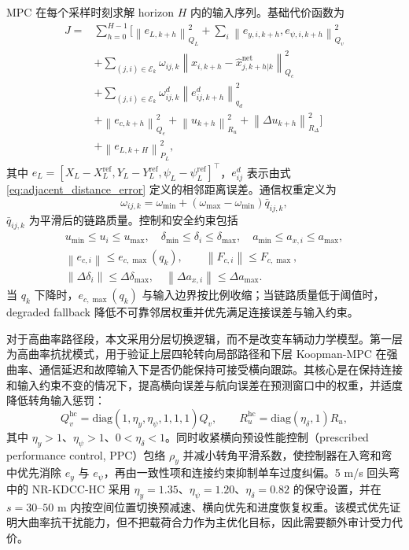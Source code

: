 \documentclass[twocolumn,3p,times,procedia]{elsarticle}
\newcommand{\MethodHC}{NR-KDCC-HC}
\newcommand{\norm}[1]{\left\lVert #1 \right\rVert}
\begin{document}
MPC 在每个采样时刻求解 horizon $H$ 内的输入序列。基础代价函数为
\begin{equation}
\begin{aligned}
J=&\sum_{h=0}^{H-1}
\Big[
\norm{e_{L,k+h}}_{Q_L}^2+
\sum_i\norm{e_{y,i,k+h},e_{\psi,i,k+h}}_{Q_v}^2\\
&+\sum_{(j,i)\in\mathcal E_k}\omega_{ij,k}\norm{x_{i,k+h}-\hat x_{j,k+h|k}^{\mathrm{net}}}_{Q_c}^2\\
&+\sum_{(j,i)\in\mathcal E_k}\omega^d_{ij,k}\norm{e^d_{ij,k+h}}_{q_d}^2\\
&+\norm{e_{c,k+h}}_{Q_e}^2+
\norm{u_{k+h}}_{R_u}^2+
\norm{\Delta u_{k+h}}_{R_\Delta}^2
\Big]\\
&+\norm{e_{L,k+H}}_{P_L}^2 ,
\end{aligned}
\label{eq:mpc_cost}
\end{equation}
其中 $e_L=[X_L-X_L^{\mathrm{ref}},Y_L-Y_L^{\mathrm{ref}},\psi_L-\psi_L^{\mathrm{ref}}]^\top$，$e^d_{ij}$ 表示由式 \eqref{eq:adjacent_distance_error} 定义的相邻距离误差。通信权重定义为
\begin{equation}
\omega_{ij,k}=\omega_{\min}+(\omega_{\max}-\omega_{\min})\bar q_{ij,k},
\label{eq:comm_weight}
\end{equation}
$\bar q_{ij,k}$ 为平滑后的链路质量。控制和安全约束包括
\begin{equation}
\begin{gathered}
u_{\min}\le u_i\le u_{\max},\quad
\delta_{\min}\le\delta_i\le\delta_{\max},\quad
a_{\min}\le a_{x,i}\le a_{\max},\\
\norm{e_{c,i}}\le e_{c,\max}(q_k),\qquad
\norm{F_{c,i}}\le F_{c,\max},\\
\norm{\Delta \delta_i}\le \Delta\delta_{\max},\quad
\norm{\Delta a_{x,i}}\le \Delta a_{\max}.
\end{gathered}
\label{eq:constraints}
\end{equation}
当 $q_k$ 下降时，$e_{c,\max}(q_k)$ 与输入边界按比例收缩；当链路质量低于阈值时，degraded fallback 降低不可靠邻居权重并优先满足连接误差与输入约束。

对于高曲率路径段，本文采用分层切换逻辑，而不是改变车辆动力学模型。第一层为高曲率抗扰模式，用于验证上层四轮转向局部路径和下层 Koopman-MPC 在强曲率、通信延迟和故障输入下是否仍能保持可接受横向跟踪。其核心是在保持连接和输入约束不变的情况下，提高横向误差与航向误差在预测窗口中的权重，并适度降低转角输入惩罚：
\begin{equation}
Q_v^{\mathrm{hc}}=\mathrm{diag}(1,\eta_y,\eta_\psi,1,1,1)Q_v,\qquad
R_u^{\mathrm{hc}}=\mathrm{diag}(\eta_\delta,1)R_u ,
\label{eq:high_curvature_lateral_priority}
\end{equation}
其中 $\eta_y>1$、$\eta_\psi>1$、$0<\eta_\delta<1$。同时收紧横向预设性能控制（prescribed performance control, PPC）包络 $\rho_y$ 并减小转角平滑系数，使控制器在入弯和弯中优先消除 $e_y$ 与 $e_\psi$，再由一致性项和连接约束抑制单车过度纠偏。5 m/s 回头弯中的 \MethodHC{} 采用 $\eta_y=1.35$、$\eta_\psi=1.20$、$\eta_\delta=0.82$ 的保守设置，并在 $s=30$--$50$ m 内按空间位置切换预减速、横向优先和进度恢复权重。该模式优先证明大曲率抗干扰能力，但不把载荷合力作为主优化目标，因此需要额外审计受力代价。
\end{document}
